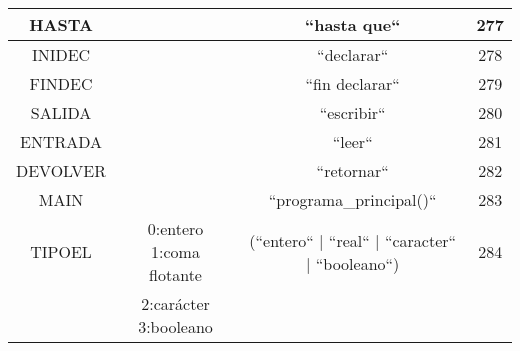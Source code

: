 \begin{table}[H]
\begin{tabular}{| c | c | c | c |}
HASTA& & ``hasta que`` & 277\\ \hline
INIDEC& & ``declarar`` & 278\\ \hline
FINDEC& & ``fin declarar`` & 279\\ \hline
SALIDA & & ``escribir`` & 280\\ \hline
ENTRADA & & ``leer`` & 281\\ \hline
DEVOLVER & & ``retornar`` & 282\\ \hline
MAIN & & ``programa\_principal()`` & 283\\ \hline
TIPOEL & 0:entero 1:coma flotante  & (``entero`` | ``real`` | ``caracter`` | ``booleano``) & 284\\
& 2:carácter 3:booleano& & \\ \hline

\end{tabular}
\end{table}

